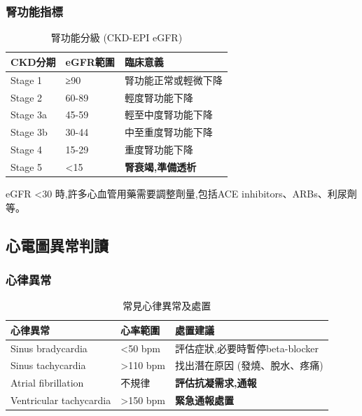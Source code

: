 \documentclass[12pt,a4paper]{article}
\newcommand{\note}[1]{
    \par
    \noindent
    \begin{tcolorbox}[
        colback=emergency_blue!5!white,
        colframe=emergency_blue,
        title=\textbf{重點提醒},
        fonttitle=\bfseries,
        boxrule=0.5pt,
        arc=3pt,
        left=6pt,
        right=6pt,
        top=6pt,
        bottom=6pt
    ]
    #1
    \end{tcolorbox}
}
\begin{document}
\subsubsection{腎功能指標}
\begin{table}[h]
    \centering
    \caption{腎功能分級 (CKD-EPI eGFR)}
    \begin{tabular}{p{3cm} p{4cm} p{7cm}}
        \toprule
        \textbf{CKD分期} & \textbf{eGFR範圍} & \textbf{臨床意義} \\
        \midrule
        Stage 1 & ≥90 & 腎功能正常或輕微下降 \\
        Stage 2 & 60-89 & 輕度腎功能下降 \\
        Stage 3a & 45-59 & 輕至中度腎功能下降 \\
        Stage 3b & 30-44 & 中至重度腎功能下降 \\
        Stage 4 & 15-29 & 重度腎功能下降 \\
        Stage 5 & <15 & \textcolor{emergency_red}{\textbf{腎衰竭,準備透析}} \\
        \bottomrule
    \end{tabular}
\end{table}

\note{
eGFR <30 時,許多心血管用藥需要調整劑量,包括ACE inhibitors、ARBs、利尿劑等。
}

\subsection{心電圖異常判讀}

\subsubsection{心律異常}
\begin{table}[h]
    \centering
    \caption{常見心律異常及處置}
    \begin{tabular}{p{4cm} p{4cm} p{6cm}}
        \toprule
        \textbf{心律異常} & \textbf{心率範圍} & \textbf{處置建議} \\
        \midrule
        Sinus bradycardia & <50 bpm & 評估症狀,必要時暫停beta-blocker \\
        Sinus tachycardia & >110 bpm & 找出潛在原因 (發燒、脫水、疼痛) \\
        Atrial fibrillation & 不規律 & \textcolor{emergency_red}{\textbf{評估抗凝需求,通報}} \\
        Ventricular tachycardia & >150 bpm & \textcolor{emergency_red}{\textbf{緊急通報處置}} \\
        \bottomrule
    \end{tabular}
\end{table}
\end{document}
